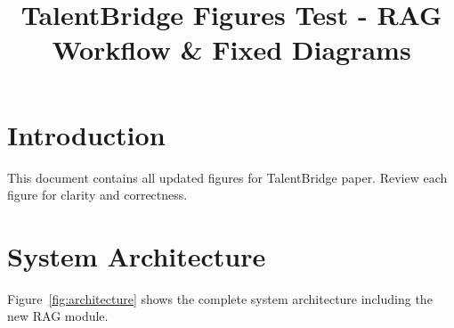 \documentclass[conference]{IEEEtran}
\begin{document}
\title{TalentBridge Figures Test - RAG Workflow \& Fixed Diagrams}

\author{
}

\maketitle

\section{Introduction}
This document contains all updated figures for TalentBridge paper. Review each figure for clarity and correctness.

\section{System Architecture}

Figure~\ref{fig:architecture} shows the complete system architecture including the new RAG module.
\end{document}
